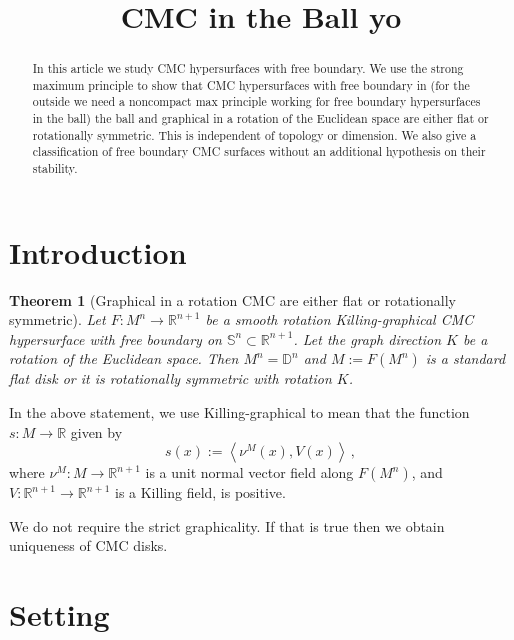 \documentclass[10pt]{amsart}
\title{CMC in the Ball yo}
\author{}
\newcommand{\IP}[2]{\left< #1 , #2 \right>}
\newcommand{\R}{\ensuremath{\mathbb{R}}}
\newcommand{\D}{\ensuremath{\mathbb{D}}}
\renewcommand{\S}{\ensuremath{\mathbb{S}}}
\newtheorem{thm}{Theorem}[section]
\theoremstyle{remark}
\begin{document}
\begin{abstract}
In this article we study CMC hypersurfaces with free boundary.
We use the strong maximum principle to show that CMC hypersurfaces with free
boundary in (for the outside we need a noncompact max principle working for
free boundary hypersurfaces in the ball) the ball and graphical in a rotation
of the Euclidean space are either flat or rotationally symmetric.  This is
independent of topology or dimension.
We also give a classification of free boundary CMC surfaces without an
additional hypothesis on their stability.
\end{abstract}

\maketitle

\section{Introduction}%


\begin{thm}[Graphical in a rotation CMC are either flat or rotationally symmetric]
Let $F:M^n\rightarrow\R^{n+1}$ be a smooth rotation Killing-graphical CMC
hypersurface with free boundary on $\S^n\subset\R^{n+1}$. Let the graph direction $K$ be a rotation of the Euclidean space. Then $M^n = \D^n$
and $M := F(M^n)$ is a standard flat disk or it is rotationally symmetric with rotation $K$.
\label{thmuniqueness}
\end{thm}

In the above statement, we use Killing-graphical to mean that the function
$s:M\rightarrow\R$ given by
\begin{equation}
\label{EQsV}
s(x) := \IP{\nu^M(x)}{V(x)}\,,
\end{equation}
where $\nu^M:M\rightarrow\R^{n+1}$ is a unit normal vector field along $F(M^n)$,
and $V:\R^{n+1}\rightarrow\R^{n+1}$ is a Killing field,
is positive.

 We do not require the strict graphicality. If that is true then we obtain uniqueness of CMC disks.


\section{Setting}%
\end{document}

